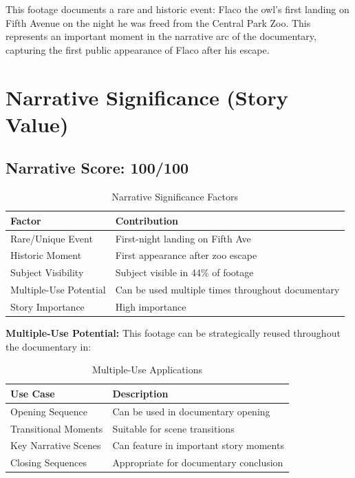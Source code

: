 \documentclass[
  11pt,
]{article}
\begin{document}
This footage documents a rare and historic event: Flaco the owl's first
landing on Fifth Avenue on the night he was freed from the Central Park
Zoo. This represents an important moment in the narrative arc of the
documentary, capturing the first public appearance of Flaco after his
escape.

\needspace{20cm}
\section{Narrative Significance (Story Value)}

\subsection{Narrative Score: 100/100}

\begin{table}[h]
\centering
\small
\caption{Narrative Significance Factors}
\label{tab-narrative-factors}
\begin{tabular}{p{3cm}p{6cm}}
\toprule
\textbf{Factor} & \textbf{Contribution} \\
\midrule
Rare/Unique Event & First-night landing on Fifth Ave \\
Historic Moment & First appearance after zoo escape \\
Subject Visibility & Subject visible in 44\% of footage \\
Multiple-Use Potential & Can be used multiple times throughout documentary \\
Story Importance & High importance \\
\bottomrule
\end{tabular}
\end{table}

\textbf{Multiple-Use Potential:} This footage can be strategically
reused throughout the documentary in:

\begin{table}[h]
\centering
\small
\caption{Multiple-Use Applications}
\label{tab-multiple-use}
\begin{tabular}{p{3.5cm}p{7.5cm}}
\toprule
\textbf{Use Case} & \textbf{Description} \\
\midrule
Opening Sequence & Can be used in documentary opening \\
Transitional Moments & Suitable for scene transitions \\
Key Narrative Scenes & Can feature in important story moments \\
Closing Sequences & Appropriate for documentary conclusion \\
\bottomrule
\end{tabular}
\end{table}
\end{document}

